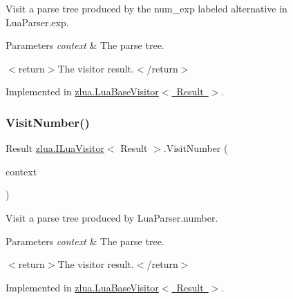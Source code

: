 Visit a parse tree produced by the {\ttfamily num\+\_\+exp} labeled alternative in Lua\+Parser.\+exp. 


\begin{DoxyParams}{Parameters}
{\em context} & The parse tree.\\
\hline
\end{DoxyParams}
$<$return$>$The visitor result.$<$/return$>$ 

Implemented in \mbox{\hyperlink{classzlua_1_1_lua_base_visitor_a8d8efa823f6a737821a8b4d10bfe2cd9}{zlua.\+Lua\+Base\+Visitor$<$ Result $>$}}.

\mbox{\label{interfacezlua_1_1_i_lua_visitor_aef219d971f96173231ecdae24f14c988}} 
\subsubsection{\texorpdfstring{Visit\+Number()}{VisitNumber()}}
{\footnotesize\ttfamily Result \mbox{\hyperlink{interfacezlua_1_1_i_lua_visitor}{zlua.\+I\+Lua\+Visitor}}$<$ Result $>$.Visit\+Number (\begin{DoxyParamCaption}\item[{\mbox{[}\+Not\+Null\mbox{]} \mbox{\hyperlink{classzlua_1_1_lua_parser_1_1_number_context}{Lua\+Parser.\+Number\+Context}}}]{context }\end{DoxyParamCaption})}



Visit a parse tree produced by Lua\+Parser.\+number. 


\begin{DoxyParams}{Parameters}
{\em context} & The parse tree.\\
\hline
\end{DoxyParams}
$<$return$>$The visitor result.$<$/return$>$ 

Implemented in \mbox{\hyperlink{classzlua_1_1_lua_base_visitor_af808d09387cef068a139c278c3ab4958}{zlua.\+Lua\+Base\+Visitor$<$ Result $>$}}.

\mbox{\label{interfacezlua_1_1_i_lua_visitor_a07aadc305c06aa2b8c8c724a0262d998}} 
